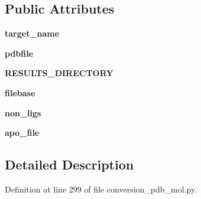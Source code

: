 \subsection*{Public Attributes}
\begin{DoxyCompactItemize}
\item 
\mbox{\label{classfragalysis__api_1_1xcimporter_1_1conversion__pdb__mol_1_1pdb__apo_a334c98d4dfa204c7673f2f0bffdc60e1}} 
{\bfseries target\+\_\+name}
\item 
\mbox{\label{classfragalysis__api_1_1xcimporter_1_1conversion__pdb__mol_1_1pdb__apo_a3c88c5322210bd36204fef2310fb80ce}} 
{\bfseries pdbfile}
\item 
\mbox{\label{classfragalysis__api_1_1xcimporter_1_1conversion__pdb__mol_1_1pdb__apo_a110bfcd93d73bebd25ec64b258bd5b6a}} 
{\bfseries R\+E\+S\+U\+L\+T\+S\+\_\+\+D\+I\+R\+E\+C\+T\+O\+RY}
\item 
\mbox{\label{classfragalysis__api_1_1xcimporter_1_1conversion__pdb__mol_1_1pdb__apo_a120a453eb2a3608650eda92ee0dc9ef9}} 
{\bfseries filebase}
\item 
\mbox{\label{classfragalysis__api_1_1xcimporter_1_1conversion__pdb__mol_1_1pdb__apo_a53ed76d729f8d926151385334f611545}} 
{\bfseries non\+\_\+ligs}
\item 
\mbox{\label{classfragalysis__api_1_1xcimporter_1_1conversion__pdb__mol_1_1pdb__apo_a9e655f451df734d5f78e8a41b8c47f89}} 
{\bfseries apo\+\_\+file}
\end{DoxyCompactItemize}


\subsection{Detailed Description}


Definition at line 299 of file conversion\+\_\+pdb\+\_\+mol.\+py.



